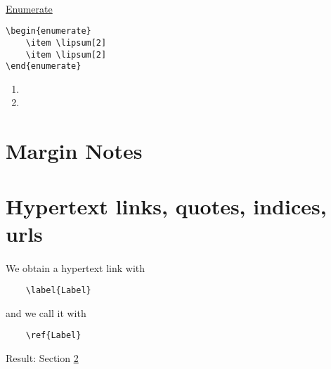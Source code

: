 \paragraph*{} \underline{Enumerate}
\begin{verbatim}
\begin{enumerate}
    \item \lipsum[2]
    \item \lipsum[2]
\end{enumerate}
\end{verbatim}

\begin{enumerate}
    \item \lipsum[2]
    \item \lipsum[2]
\end{enumerate}
\section{Margin Notes}
	\lipsum[2]
	\begin{Rmk}{}{}
    \lipsum[2]
    \lipsum[2]
    \end{Rmk}
	\lipsum[2]
    \begin{Proof}
    \lipsum[2]
    \sub
	\lipsum[2]
    \end{Proof}
\section{Hypertext links, quotes, indices, urls}\label{Label}
\paragraph*{}
We obtain a hypertext link with
\begin{verbatim}
    \label{Label}
\end{verbatim}
\noindent and we call it with
\begin{verbatim}
    \ref{Label}
\end{verbatim}
Result: Section \ref{Label}

